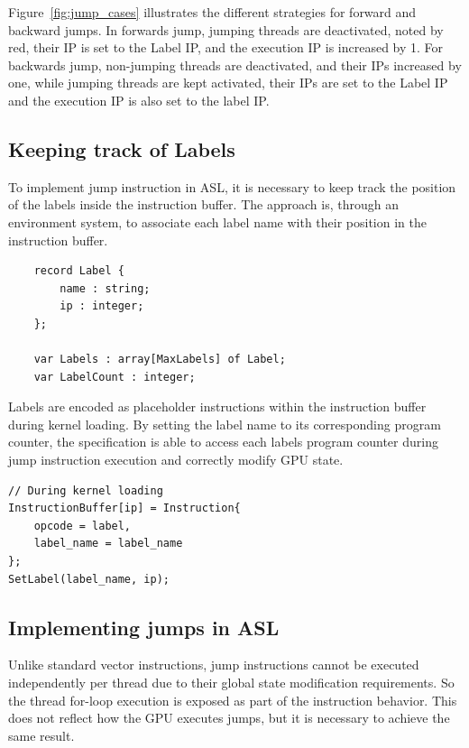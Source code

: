 Figure~\ref{fig:jump_cases} illustrates the different strategies for forward
and backward jumps. In forwards jump, jumping threads are deactivated, noted by
red, their IP is set to the Label IP, and the execution IP is increased by 1.
For backwards jump, non-jumping threads are deactivated, and their IPs
increased by one, while jumping threads are kept activated, their IPs are set
to the Label IP and the execution IP is also set to the label IP.

\subsection{Keeping track of Labels}

To implement jump instruction in ASL, it is necessary to keep track the
position of the labels inside the instruction buffer. The approach is, through
an environment system, to associate each label name with their position in the
instruction buffer.

\begin{lstlisting}
    record Label {
        name : string;
        ip : integer;
    };

    var Labels : array[MaxLabels] of Label;
    var LabelCount : integer;
\end{lstlisting}

Labels are encoded as placeholder instructions within the instruction buffer
during kernel loading. By setting the label name to its corresponding program
counter, the specification is able to access each labels program counter during
jump instruction execution and correctly modify GPU state.

\begin{lstlisting}[caption={Label Instruction Encoding}, label={lst:label_encoding}]
// During kernel loading
InstructionBuffer[ip] = Instruction{ 
    opcode = label,
    label_name = label_name 
};
SetLabel(label_name, ip);
\end{lstlisting}



\subsection{Implementing jumps in ASL}
Unlike standard vector instructions, jump instructions cannot be executed
independently per thread due to their global state modification requirements.
So the thread for-loop execution is exposed as part of the instruction
behavior. This does not reflect how the GPU executes jumps, but it is necessary
to achieve the same result.

